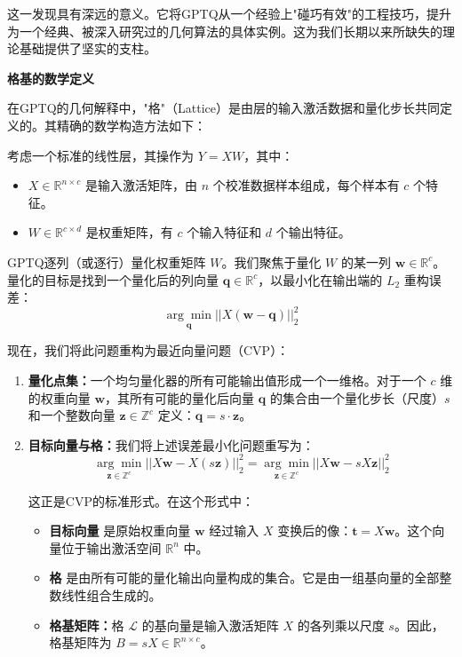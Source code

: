 \documentclass[letterpaper,twocolumn,10pt]{article}
\begin{document}
这一发现具有深远的意义。它将GPTQ从一个经验上"碰巧有效"的工程技巧，提升为一个经典、被深入研究过的几何算法的具体实例。这为我们长期以来所缺失的理论基础提供了坚实的支柱。

\textbf{格基的数学定义}

在GPTQ的几何解释中，"格"（Lattice）是由层的输入激活数据和量化步长共同定义的。其精确的数学构造方法如下：

考虑一个标准的线性层，其操作为 $Y = XW$，其中：
\begin{itemize}
\item $X \in \mathbb{R}^{n \times c}$ 是输入激活矩阵，由 $n$ 个校准数据样本组成，每个样本有 $c$ 个特征。
\item $W \in \mathbb{R}^{c \times d}$ 是权重矩阵，有 $c$ 个输入特征和 $d$ 个输出特征。
\end{itemize}

GPTQ逐列（或逐行）量化权重矩阵 $W$。我们聚焦于量化 $W$ 的某一列 $\mathbf{w} \in \mathbb{R}^{c}$。量化的目标是找到一个量化后的列向量 $\mathbf{q} \in \mathbb{R}^{c}$，以最小化在输出端的 $L_2$ 重构误差：
$$\underset{\mathbf{q}}{\arg\min} ||X(\mathbf{w} - \mathbf{q})||_2^2$$

现在，我们将此问题重构为最近向量问题（CVP）：

\begin{enumerate}
\item \textbf{量化点集：}一个均匀量化器的所有可能输出值形成一个一维格。对于一个 $c$ 维的权重向量 $\mathbf{w}$，其所有可能的量化后向量 $\mathbf{q}$ 的集合由一个量化步长（尺度）$s$ 和一个整数向量 $\mathbf{z} \in \mathbb{Z}^{c}$ 定义：$\mathbf{q} = s \cdot \mathbf{z}$。

\item \textbf{目标向量与格：}我们将上述误差最小化问题重写为：
   $$\underset{\mathbf{z} \in \mathbb{Z}^{c}}{\arg\min} ||X\mathbf{w} - X(s\mathbf{z})||_2^2 = \underset{\mathbf{z} \in \mathbb{Z}^{c}}{\arg\min} ||X\mathbf{w} - sX\mathbf{z}||_2^2$$
   
   这正是CVP的标准形式。在这个形式中：
   \begin{itemize}
   \item \textbf{目标向量} 是原始权重向量 $\mathbf{w}$ 经过输入 $X$ 变换后的像：$\mathbf{t} = X\mathbf{w}$。这个向量位于输出激活空间 $\mathbb{R}^{n}$ 中。
   \item \textbf{格} 是由所有可能的量化输出向量构成的集合。它是由一组基向量的全部整数线性组合生成的。
   \item \textbf{格基矩阵：}格 $\mathcal{L}$ 的基向量是输入激活矩阵 $X$ 的各列乘以尺度 $s$。因此，格基矩阵为 $B = sX \in \mathbb{R}^{n \times c}$。
   \end{itemize}
\end{enumerate}
\end{document}
